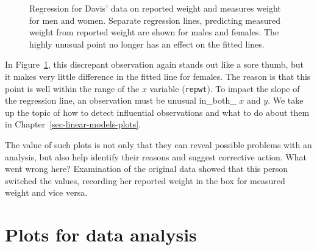 \documentclass[
  letterpaper,
  10pt,
  krantz2]{krantz}
\begin{document}
\begin{figure}[H]


\caption{\label{fig-ch02-davis-reg2}Regression for Davis' data on
reported weight and measures weight for men and women. Separate
regression lines, predicting measured weight from reported weight are
shown for males and females. The highly unusual point no longer has an
effect on the fitted lines.}

\end{figure}%

In Figure~\ref{fig-ch02-davis-reg2}, this discrepant observation again
stands out like a sore thumb, but it makes very little difference in the
fitted line for females. The reason is that this point is well within
the range of the \(x\) variable (\texttt{repwt}). To impact the slope of
the regression line, an observation must be unusual in\_both\_ \(x\) and
\(y\). We take up the topic of how to detect influential observations
and what to do about them in Chapter~\ref{sec-linear-models-plots}.

The value of such plots is not only that they can reveal possible
problems with an analysis, but also help identify their reasons and
suggest corrective action. What went wrong here? Examination of the
original data showed that this person switched the values, recording her
reported weight in the box for measured weight and vice versa.

\section{Plots for data analysis}\label{plots-for-data-analysis}
\end{document}

